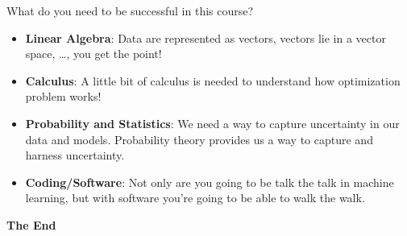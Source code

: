 \documentclass[aspectratio=169,xcolor=dvipsnames,svgnames,x11names,fleqn]{beamer}
\begin{document}
\begin{frame}{What do you need to be successful in this course?}
\begin{itemize}
    \item<2-> {\bf\color{MediumBlue}Linear Algebra}: Data are represented as vectors, vectors lie in a vector space, \ldots, you get the point!
      \item<3-> {\bf\color{MediumBlue}Calculus}: A little bit of calculus is needed to understand  how optimization problem works!
    \item<4-> {\bf\color{MediumBlue}Probability and Statistics}: We need a way to capture uncertainty in our data and models. Probability theory provides us a way to capture and harness uncertainty. 
    \item<5-> {\bf\color{MediumBlue}Coding/Software}: Not only are you going to be talk the talk in machine learning, but with software you're going to be able to walk the walk.
\end{itemize}
\end{frame}


\begin{frame}
    \Huge{\centerline{\color{bubblegumPink}\textbf{The End}}}
\end{frame}




\end{document}
